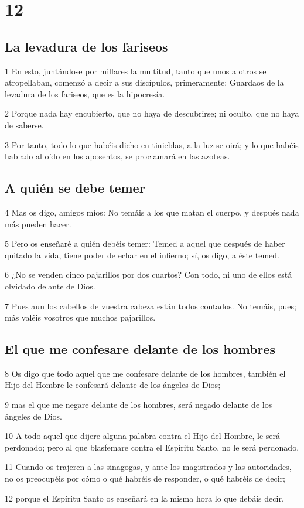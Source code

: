 \chapter{12}

\section*{La levadura de los fariseos}

\par 1 En esto, juntándose por millares la multitud, tanto que unos a otros se atropellaban, comenzó a decir a sus discípulos, primeramente: Guardaos de la levadura de los fariseos, que es la hipocresía.
\par 2 Porque nada hay encubierto, que no haya de descubrirse; ni oculto, que no haya de saberse.
\par 3 Por tanto, todo lo que habéis dicho en tinieblas, a la luz se oirá; y lo que habéis hablado al oído en los aposentos, se proclamará en las azoteas.

\section*{A quién se debe temer}

\par 4 Mas os digo, amigos míos: No temáis a los que matan el cuerpo, y después nada más pueden hacer.
\par 5 Pero os enseñaré a quién debéis temer: Temed a aquel que después de haber quitado la vida, tiene poder de echar en el infierno; sí, os digo, a éste temed.
\par 6 ¿No se venden cinco pajarillos por dos cuartos? Con todo, ni uno de ellos está olvidado delante de Dios.
\par 7 Pues aun los cabellos de vuestra cabeza están todos contados. No temáis, pues; más valéis vosotros que muchos pajarillos.

\section*{El que me confesare delante de los hombres}

\par 8 Os digo que todo aquel que me confesare delante de los hombres, también el Hijo del Hombre le confesará delante de los ángeles de Dios;
\par 9 mas el que me negare delante de los hombres, será negado delante de los ángeles de Dios.
\par 10 A todo aquel que dijere alguna palabra contra el Hijo del Hombre, le será perdonado; pero al que blasfemare contra el Espíritu Santo, no le será perdonado.
\par 11 Cuando os trajeren a las sinagogas, y ante los magistrados y las autoridades, no os preocupéis por cómo o qué habréis de responder, o qué habréis de decir;
\par 12 porque el Espíritu Santo os enseñará en la misma hora lo que debáis decir.

